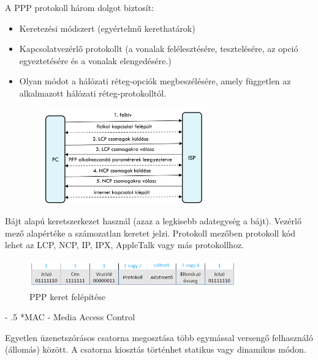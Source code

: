 \documentclass[12pt]{article}
\makeatletter
\renewcommand\paragraph{%
	\@startsection{paragraph}{4}{0mm}%
	{-\baselineskip}%
	{.5\baselineskip}%
	{\normalfont\normalsize\bfseries}}
\makeatother
\begin{document}
\begin{itemize}[leftmargin=7.5mm]
    A PPP protokoll három dolgot biztosít:
    \begin{itemize}[leftmargin=7.5mm]
        \renewcommand{\labelitemii}{$\vcenter{\hbox{\tiny$\circ$}}$}
        \item  Keretezési módszert (egyértelmű kerethatárok)
        \item Kapcsolatvezérlő protokollt (a vonalak felélesztésére, tesztelésére, az opció egyeztetésére és a vonalak elengedésére.)
        \item Olyan módot a hálózati réteg-opciók megbeszélésére, amely független az alkalmazott hálózati réteg-protokolltól.
            \begin{figure}[H]
                \centering
                \includegraphics[width=0.65\textwidth]{img/ppp.png}
                \caption{}	
            \end{figure}
        \end{itemize}
        Bájt alapú keretszerkezet használ (azaz a legkisebb adategység a bájt).
        Vezérlő mező alapértéke a számozatlan keretet jelzi. Protokoll mezőben protokoll kód lehet az LCP, NCP, IP, IPX, AppleTalk vagy más protokollhoz.
        \begin{figure}[H]
        	\centering
        	\includegraphics[width=0.8\textwidth]{img/ppp_keret.png}
        	\caption{PPP keret felépítése}	
        \end{figure}
    \end{itemize}
   	
   \paragraph*{MAC - Media Access Control\\}

    Egyetlen üzenetszórásos csatorna megosztása több egymással versengő felhasználó (állomás) között. A csatorna kiosztás történhet statikus vagy dinamikus módon.
\end{document}
